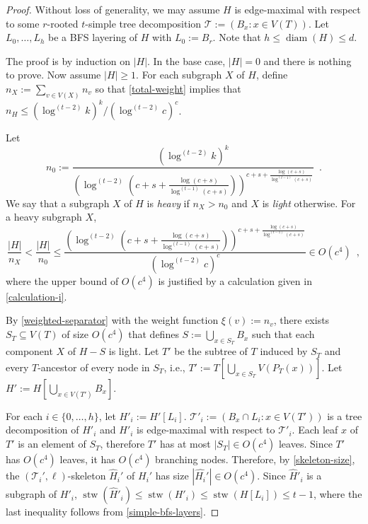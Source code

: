 \documentclass[kpfonts]{patmorin}
\DeclareMathOperator{\diam}{diam}
\DeclareMathOperator{\stw}{stw}
\theoremstyle{named}
\begin{document}
\begin{proof}
    Without loss of generality, we may assume $H$ is edge-maximal with respect to some $r$-rooted $t$-simple tree decomposition $\mathcal{T}:=(B_x:x\in V(T))$.  Let $L_0,\ldots,L_h$ be a BFS layering of $H$ with $L_0:=B_r$.  Note that $h\le\diam(H)\le d$.

    The proof is by induction on $|H|$.  In the base case, $|H|=0$ and there is nothing to prove. Now assume $|H|\ge 1$.  For each subgraph $X$ of $H$, define $n_{X}:=\sum_{v\in V(X)} n_v$ so that \cref{total-weight} implies that $n_H\le(\log^{(t-2)} k)^k/(\log^{(t-2)}c)^c$.

    Let
    \begin{equation}
        n_0 := \frac{(\log^{(t-2)} k)^k}{\left(\log^{(t-2)}\left(c+s+\tfrac{\log(c+s)}{\log^{(t-1)}(c+s)}\right)\right)^{c+s+\tfrac{\log(c+s)}{\log^{(t-1)}(c+s)}}} \enspace . \label{heavy-def}
    \end{equation}
    We say that a subgraph $X$ of $H$ is \emph{heavy} if $n_X>n_0$ and $X$ is \emph{light} otherwise.  For a heavy subgraph $X$,
    \begin{equation}
        \frac{|H|}{n_X} < \frac{|H|}{n_0}
        \le \frac{\left(\log^{(t-2)}\left(c+s+\tfrac{\log(c+s)}{\log^{(t-1)}(c+s)}\right)\right)^{c+s+\tfrac{\log(c+s)}{\log^{(t-1)}(c+s)}}}{(\log^{(t-2)} c)^c}
         \in O\left(c^4\right)
    \enspace ,
    \end{equation}
    where the upper bound of $O(c^4)$ is justified by a calculation given in \cref{calculation-i}.

    By \cref{weighted-separator} with the weight function $\xi(v):=n_v$, there exists $S_T\subseteq V(T)$ of size $O(c^4)$ that defines $S:=\bigcup_{x\in S_T} B_x$ such that each component $X$ of $H-S$ is light.  Let $T'$ be the subtree of $T$ induced by $S_T$ and every $T$-ancestor of every node in $S_T$, i.e., $T':=T[\bigcup_{x\in S_T} V(P_T(x))]$. Let $H':=H[\bigcup_{x\in V(T')} B_x]$.

    For each $i\in\{0,\ldots,h\}$, let $H'_i:=H'[L_i]$.   $\mathcal{T}'_i:=(B_x\cap L_i: x\in V(T'))$ is a tree decomposition of $H'_i$ and $H'_i$ is edge-maximal with respect to $\mathcal{T}'_i$.  Each leaf $x$ of $T'$ is an element of $S_T$, therefore $T'$ has at most $|S_T|\in O(c^4)$ leaves. Since $T'$ has $O(c^4)$ leaves, it has $O(c^4)$ branching nodes.  Therefore, by \cref{skeleton-size}, the $(\mathcal{T}_i',\ell)$-skeleton $\hat{H}_i'$ of $H_i'$ has size $|\hat{H_i}'|\in O(c^4)$.  Since $\hat{H}'_i$ is a subgraph of $H'_i$, $\stw(\hat{H}'_i)\le\stw(H'_i)\le\stw(H[L_i])\le t-1$, where the last inequality follows from \cref{simple-bfs-layers}.


\end{proof}
\end{document}

